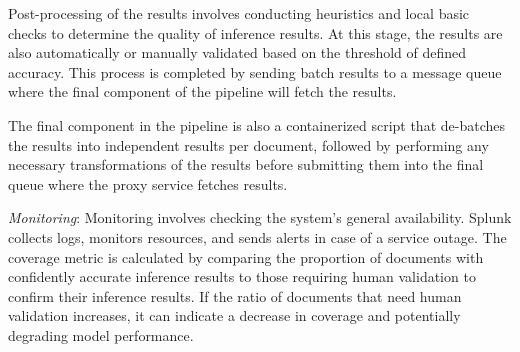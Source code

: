 Post-processing of the results involves conducting heuristics and local basic checks to determine the quality of inference results. At this stage, the results are also automatically or manually validated based on the threshold of defined accuracy. This process is completed by sending batch results to a message queue where the final component of the pipeline will fetch the results. %

The final component in the pipeline is also a containerized script that de-batches the results into independent results per document, followed by performing any necessary transformations of the results before submitting them into the final queue where the proxy service fetches results.

\textit{Monitoring}: Monitoring involves checking the system's general availability. Splunk collects logs, monitors resources, and sends alerts in case of a service outage. The coverage metric is calculated by comparing the proportion of documents with confidently accurate inference results to those requiring human validation to confirm their inference results. If the ratio of documents that need human validation increases, it can indicate a decrease in coverage and potentially degrading model performance.